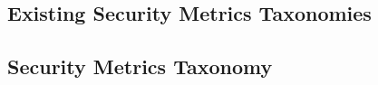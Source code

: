 




\subsection{Existing Security Metrics Taxonomies}\label{sec:background:existing_metrics_taxonomies}



\subsection{Security Metrics Taxonomy}\label{sec:background:metrics_by_cybok}




% 




% 

% 